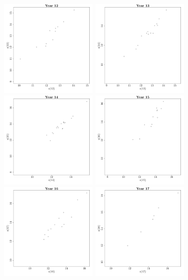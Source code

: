\documentclass{article}\usepackage[]{graphicx}\usepackage[]{color}
\newenvironment{knitrout}{}{} %
\begin{document}
\begin{knitrout}
\includegraphics[width=0.35\textwidth]{figure/Reshaping12} 
\includegraphics[width=0.35\textwidth]{figure/Reshaping13} 
\includegraphics[width=0.35\textwidth]{figure/Reshaping14} 
\includegraphics[width=0.35\textwidth]{figure/Reshaping15} 
\includegraphics[width=0.35\textwidth]{figure/Reshaping16} 
\includegraphics[width=0.35\textwidth]{figure/Reshaping17} 

\end{knitrout}
\end{document}
